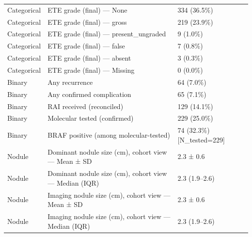 \begin{table}[htbp]
\begin{tabular}{lll}
Categorical & ETE grade (final) — None & 334 (36.5\%) \\
Categorical & ETE grade (final) — gross & 219 (23.9\%) \\
Categorical & ETE grade (final) — present\_ungraded & 9 (1.0\%) \\
Categorical & ETE grade (final) — false & 7 (0.8\%) \\
Categorical & ETE grade (final) — absent & 3 (0.3\%) \\
Categorical & ETE grade (final) — Missing & 0 (0.0\%) \\
Binary & Any recurrence & 64 (7.0\%) \\
Binary & Any confirmed complication & 65 (7.1\%) \\
Binary & RAI received (reconciled) & 129 (14.1\%) \\
Binary & Molecular tested (confirmed) & 229 (25.0\%) \\
Binary & BRAF positive (among molecular-tested) & 74 (32.3\%) [N\_tested=229] \\
Nodule & Dominant nodule size (cm), cohort view — Mean ± SD & 2.3 ± 0.6 \\
Nodule & Dominant nodule size (cm), cohort view — Median (IQR) & 2.3 (1.9–2.6) \\
Nodule & Imaging nodule size (cm), cohort view — Mean ± SD & 2.3 ± 0.6 \\
Nodule & Imaging nodule size (cm), cohort view — Median (IQR) & 2.3 (1.9–2.6) \\
\bottomrule
\end{tabular}
\end{table}

